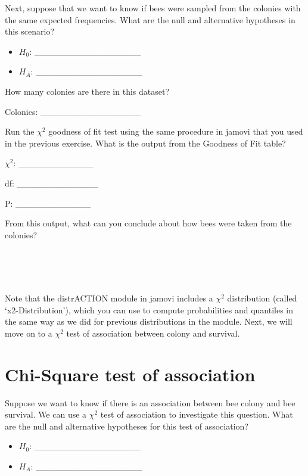 \documentclass[
]{scrbook}
\begin{document}
Next, suppose that we want to know if bees were sampled from the colonies with the same expected frequencies.
What are the null and alternative hypotheses in this scenario?

\begin{itemize}
\item
  \(H_{0}\): \_\_\_\_\_\_\_\_\_\_\_\_\_\_\_\_\_
\item
  \(H_{A}\): \_\_\_\_\_\_\_\_\_\_\_\_\_\_\_\_\_
\end{itemize}

How many colonies are there in this dataset?

Colonies: \_\_\_\_\_\_\_\_\_\_\_\_\_\_\_\_

Run the \(\chi^{2}\) goodness of fit test using the same procedure in jamovi that you used in the previous exercise.
What is the output from the Goodness of Fit table?

\(\chi^{2}\): \_\_\_\_\_\_\_\_\_\_\_\_

df: \_\_\_\_\_\_\_\_\_\_\_\_\_

P: \_\_\_\_\_\_\_\_\_\_\_\_

From this output, what can you conclude about how bees were taken from the colonies?

\begin{verbatim}




\end{verbatim}

Note that the distrACTION module in jamovi includes a \(\chi^{2}\) distribution (called `x2-Distribution'), which you can use to compute probabilities and quantiles in the same way as we did for previous distributions in the module.
Next, we will move on to a \(\chi^{2}\) test of association between colony and survival.

\hypertarget{chi-square-test-of-association}{%
\section{Chi-Square test of association}\label{chi-square-test-of-association}}

Suppose we want to know if there is an association between bee colony and bee survival.
We can use a \(\chi^{2}\) test of association to investigate this question.
What are the null and alternative hypotheses for this test of association?

\begin{itemize}
\item
  \(H_{0}\): \_\_\_\_\_\_\_\_\_\_\_\_\_\_\_\_\_
\item
  \(H_{A}\): \_\_\_\_\_\_\_\_\_\_\_\_\_\_\_\_\_
\end{itemize}
\end{document}
